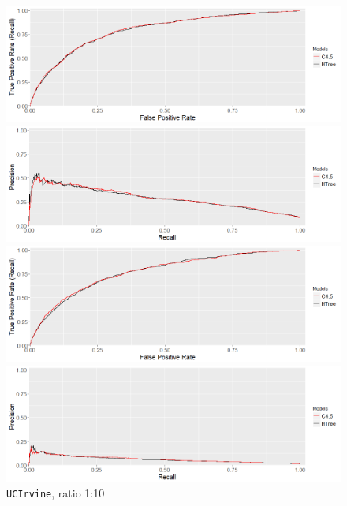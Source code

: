 \documentclass{acm_proc_article-sp}
\begin{document}
\begin{figure}
	\begin{multicols}{2}
		\includegraphics[width=\linewidth]{UC_Irvine_ROC_1_10}\par 
		\includegraphics[width=\linewidth]{UC_Irvine_PR_1_10}\par 
	\end{multicols}
	\caption{\texttt{UCIrvine}, ratio 1:10}
	\label{UCIrvine10}
	\begin{multicols}{2}
		\includegraphics[width=\linewidth]{UC_Irvine_ROC_1_60}\par 
		\includegraphics[width=\linewidth]{UC_Irvine_PR_1_60}\par 

\end{multicols}
\end{figure}
\end{document}
